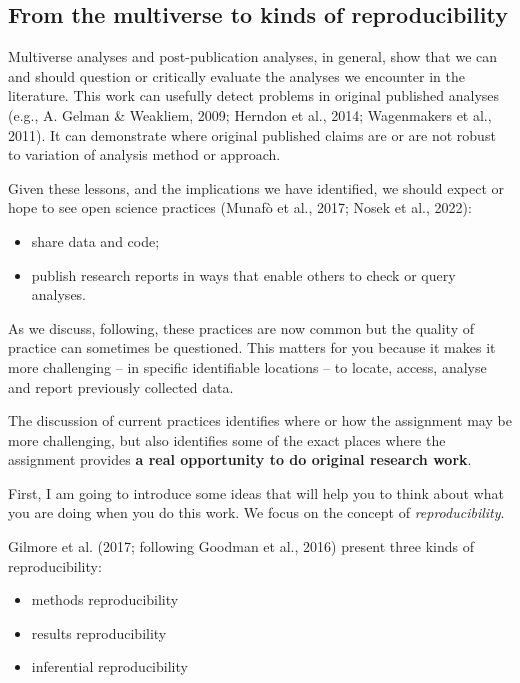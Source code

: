 \documentclass[
  letterpaper,
  DIV=11,
  numbers=noendperiod]{scrreprt}
\providecommand{\tightlist}{%
  \setlength{\itemsep}{0pt}\setlength{\parskip}{0pt}}\usepackage{longtable,booktabs,array}
\begin{document}
\hypertarget{from-the-multiverse-to-kinds-of-reproducibility}{%
\subsection{From the multiverse to kinds of
reproducibility}\label{from-the-multiverse-to-kinds-of-reproducibility}}

Multiverse analyses and post-publication analyses, in general, show that
we can and should question or critically evaluate the analyses we
encounter in the literature. This work can usefully detect problems in
original published analyses (e.g., A. Gelman \& Weakliem, 2009; Herndon
et al., 2014; Wagenmakers et al., 2011). It can demonstrate where
original published claims are or are not robust to variation of analysis
method or approach.

Given these lessons, and the implications we have identified, we should
expect or hope to see open science practices (Munafò et al., 2017; Nosek
et al., 2022):

\begin{itemize}
\tightlist
\item
  share data and code;
\item
  publish research reports in ways that enable others to check or query
  analyses.
\end{itemize}

As we discuss, following, these practices are now common but the quality
of practice can sometimes be questioned. This matters for you because it
makes it more challenging -- in specific identifiable locations -- to
locate, access, analyse and report previously collected data.

The discussion of current practices identifies where or how the
assignment may be more challenging, but also identifies some of the
exact places where the assignment provides \textbf{a real opportunity to
do original research work}.

First, I am going to introduce some ideas that will help you to think
about what you are doing when you do this work. We focus on the concept
of \emph{reproducibility}.

Gilmore et al. (2017; following Goodman et al., 2016) present three
kinds of reproducibility:

\begin{itemize}
\tightlist
\item
  methods reproducibility
\item
  results reproducibility
\item
  inferential reproducibility
\end{itemize}
\end{document}
